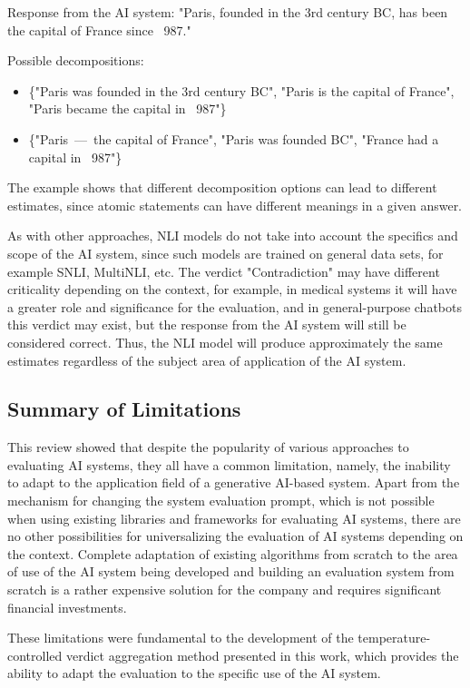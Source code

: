 \documentclass[sn-basic]{sn-jnl}
\theoremstyle{thmstyleone}%
\theoremstyle{thmstyletwo}%
\theoremstyle{thmstylethree}%
\begin{document}
Response from the AI system: "Paris, founded in the 3rd century BC, has been the capital of France since ~987." 

Possible decompositions: 
\begin{itemize} 
\item \{"Paris was founded in the 3rd century BC", "Paris is the capital of France", "Paris became the capital in ~987"\} 
\item \{"Paris~---~the capital of France", "Paris was founded BC", "France had a capital in ~987"\} 
\end{itemize}

The example shows that different decomposition options can lead to different estimates, since atomic statements can have different meanings in a given answer.

As with other approaches, NLI models do not take into account the specifics and scope of the AI system, since such models are trained on general data sets, for example SNLI, MultiNLI, etc. The verdict "Contradiction" may have different criticality depending on the context, for example, in medical systems it will have a greater role and significance for the evaluation, and in general-purpose chatbots this verdict may exist, but the response from the AI system will still be considered correct. Thus, the NLI model will produce approximately the same estimates regardless of the subject area of application of the AI system.

\subsection{Summary of Limitations}

This review showed that despite the popularity of various approaches to evaluating AI systems, they all have a common limitation, namely, the inability to adapt to the application field of a generative AI-based system. Apart from the mechanism for changing the system evaluation prompt, which is not possible when using existing libraries and frameworks for evaluating AI systems, there are no other possibilities for universalizing the evaluation of AI systems depending on the context. Complete adaptation of existing algorithms from scratch to the area of use of the AI system being developed and building an evaluation system from scratch is a rather expensive solution for the company and requires significant financial investments.

These limitations were fundamental to the development of the temperature-controlled verdict aggregation method presented in this work, which provides the ability to adapt the evaluation to the specific use of the AI system.
\end{document}
